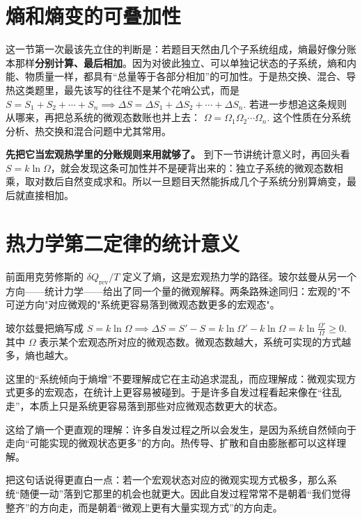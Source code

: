 \documentclass[lang=cn,11pt]{elegantbook}
\newcommand{\bridge}[1]{\begin{note}#1\end{note}}
\begin{document}
\section{熵和熵变的可叠加性}

这一节第一次最该先立住的判断是：若题目天然由几个子系统组成，熵最好像分账本那样\textbf{分别计算、最后相加}。因为对彼此独立、可以单独记状态的子系统，熵和内能、物质量一样，都具有“总量等于各部分相加”的可加性。于是热交换、混合、导热这类题里，最先该写的往往不是某个花哨公式，而是
 \(S=S_1+S_2+\cdots+S_n \implies \Delta S=\Delta S_1+\Delta S_2+\cdots+\Delta S_n.\) 
若进一步想追这条规则从哪来，再把总系统的微观态数账也并上去：
 \(\Omega=\Omega_1\Omega_2\cdots\Omega_n.\) 
这个性质在分系统分析、热交换和混合问题中尤其常用。

\begin{note}
\textbf{先把它当宏观热学里的分账规则来用就够了。} 到下一节讲统计意义时，再回头看 \(S=k\ln\Omega\)，就会发现这条可加性并不是硬背出来的：独立子系统的微观态数相乘，取对数后自然变成求和。所以一旦题目天然能拆成几个子系统分别算熵变，最后就直接相加。
\end{note}

\section{热力学第二定律的统计意义}

\bridge{前面用克劳修斯的 \(\delta Q_{\mathrm{rev}}/T\) 定义了熵，这是宏观热力学的路径。玻尔兹曼从另一个方向——统计力学——给出了同一个量的微观解释。两条路殊途同归：宏观的"不可逆方向"对应微观的"系统更容易落到微观态数更多的宏观态"。}

玻尔兹曼把熵写成
 \(S=k\ln\Omega \implies \Delta S=S'-S=k\ln\Omega'-k\ln\Omega =k\ln\frac{\Omega'}{\Omega}\ge 0.\) 
其中 \(\Omega\) 表示某个宏观态所对应的微观态数。微观态数越大，系统可实现的方式越多，熵也越大。

\begin{note}
这里的“系统倾向于熵增”不要理解成它在主动追求混乱，而应理解成：微观实现方式更多的宏观态，在统计上更容易被碰到。于是许多自发过程看起来像在“往乱走”，本质上只是系统更容易落到那些对应微观态数更大的状态。
\end{note}

\begin{remark}
这给了熵一个更直观的理解：许多自发过程之所以会发生，是因为系统自然倾向于走向“可能实现的微观状态更多”的方向。热传导、扩散和自由膨胀都可以这样理解。
\end{remark}

把这句话说得更直白一点：若一个宏观状态对应的微观实现方式极多，那么系统“随便一动”落到它那里的机会也就更大。因此自发过程常常不是朝着“我们觉得整齐”的方向走，而是朝着“微观上更有大量实现方式”的方向走。
\end{document}
